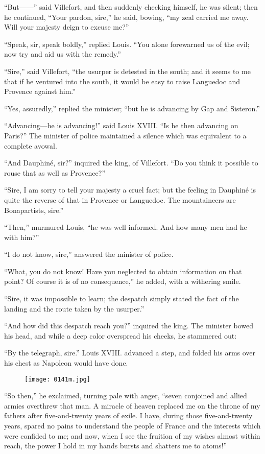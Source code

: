 “But——” said Villefort, and then suddenly checking himself, he was
silent; then he continued, “Your pardon, sire,” he said, bowing, “my
zeal carried me away. Will your majesty deign to excuse me?”

“Speak, sir, speak boldly,” replied Louis. “You alone forewarned us of
the evil; now try and aid us with the remedy.”

“Sire,” said Villefort, “the usurper is detested in the south; and it
seems to me that if he ventured into the south, it would be easy to
raise Languedoc and Provence against him.”

“Yes, assuredly,” replied the minister; “but he is advancing by Gap and
Sisteron.”

“Advancing—he is advancing!” said Louis XVIII. “Is he then advancing on
Paris?” The minister of police maintained a silence which was
equivalent to a complete avowal.

“And Dauphiné, sir?” inquired the king, of Villefort. “Do you think it
possible to rouse that as well as Provence?”

“Sire, I am sorry to tell your majesty a cruel fact; but the feeling in
Dauphiné is quite the reverse of that in Provence or Languedoc. The
mountaineers are Bonapartists, sire.”

“Then,” murmured Louis, “he was well informed. And how many men had he
with him?”

“I do not know, sire,” answered the minister of police.

“What, you do not know! Have you neglected to obtain information on
that point? Of course it is of no consequence,” he added, with a
withering smile.

“Sire, it was impossible to learn; the despatch simply stated the fact
of the landing and the route taken by the usurper.”

“And how did this despatch reach you?” inquired the king. The minister
bowed his head, and while a deep color overspread his cheeks, he
stammered out:

“By the telegraph, sire.” Louis XVIII. advanced a step, and folded his
arms over his chest as Napoleon would have done.

\begin{figure}[h]
\texttt{[image: 0141m.jpg]}
\end{figure}

“So then,” he exclaimed, turning pale with anger, “seven conjoined and
allied armies overthrew that man. A miracle of heaven replaced me on
the throne of my fathers after five-and-twenty years of exile. I have,
during those five-and-twenty years, spared no pains to understand the
people of France and the interests which were confided to me; and now,
when I see the fruition of my wishes almost within reach, the power I
hold in my hands bursts and shatters me to atoms!”


